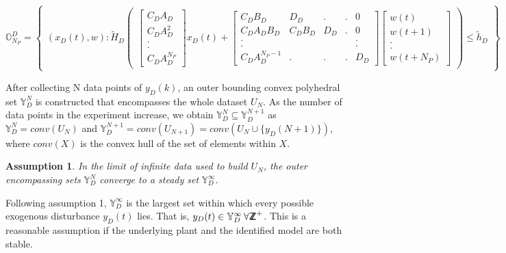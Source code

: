 \documentclass[letterpaper, 10 pt, conference]{ieeeconf}  %
\newcommand*{\ZZ}{%
	\textsf{Z\kern-1ex Z}%
}
\newtheorem{assumption}{Assumption}
\begin{document}
  \begin{table}[t]
   \begin{equation}
   \mathbb{O}_{N_P}^D=\begin{Bmatrix}(x_D(t),w):\tilde{H}_D\begin{pmatrix}\begin{bmatrix} C_DA_D\\ C_DA_D^2 \\ . \\ . \\ C_DA_D^{N_P}\end{bmatrix}x_D(t) + \begin{bmatrix}
   C_DB_D & D_D & . & . & 0 \\
   C_DA_DB_D & C_DB_D & D_D & . & 0 \\
   . &  &  &  & . \\
   . &  &  &  & . \\
   C_DA_D^{N_P-1} & . & . & . & D_D
   \end{bmatrix}
   \begin{bmatrix}
   w(t) \\ w(t+1) \\ . \\ . \\ w(t+N_P)
   \end{bmatrix}
   \end{pmatrix} \leq \tilde{h}_D
   \end{Bmatrix}
   \label{OND_set}
   \end{equation} 
  \end{table}
 After collecting N data points of $y_D(k)$, an outer bounding convex polyhedral set $\mathbb{Y}_D^N$ is constructed that encompasses the whole dataset $U_N$. As the number of data points in the experiment increase, we obtain $\mathbb{Y}_D^{N} \subseteq \mathbb{Y}_D^{N+1}$ as
 $\mathbb{Y}_D^{N} = conv(U_N)$ and  $\mathbb{Y}_D^{N+1} = conv(U_{N+1})=conv(U_{N} \cup \{y_D(N+1)\} )$, where $conv(X)$ is the convex hull of the set of elements within $X$. 
 \begin{assumption}
 	 In the limit of infinite data used to build $U_N$, the outer encompassing sets $\mathbb{Y}_D^{N}$ converge to a steady set $\mathbb{Y}_D^{\infty}$.
 \end{assumption} 
Following assumption 1, $\mathbb{Y}_D^{\infty}$ is the largest set within which every possible exogenous disturbance $y_D(t)$ lies. That is, $y_D(t) \in \mathbb{Y}_D^{\infty} \hspace{2pt}  \forall \ZZ^{+}$.  This is a reasonable assumption if the underlying plant and the identified model are both stable.
\end{document}

